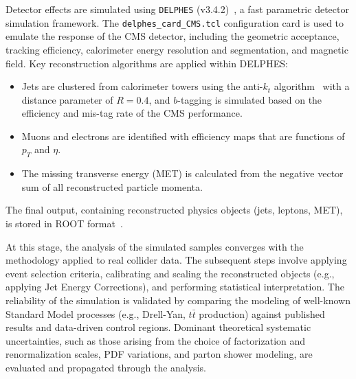 Detector effects are simulated using \texttt{DELPHES} (v3.4.2)~\parencite{deFavereau:2013fsa}, a fast parametric detector simulation framework. The \texttt{delphes\_card\_CMS.tcl} configuration card is used to emulate the response of the CMS detector, including the geometric acceptance, tracking efficiency, calorimeter energy resolution and segmentation, and magnetic field. Key reconstruction algorithms are applied within DELPHES:
\begin{itemize}
    \item Jets are clustered from calorimeter towers using the anti-$k_t$ algorithm~\parencite{Cacciari:2008gp} with a distance parameter of $R=0.4$, and $b$-tagging is simulated based on the efficiency and mis-tag rate of the CMS performance.
    \item Muons and electrons are identified with efficiency maps that are functions of $p_T$ and $\eta$.
    \item The missing transverse energy (MET) is calculated from the negative vector sum of all reconstructed particle momenta.
\end{itemize}
The final output, containing reconstructed physics objects (jets, leptons, MET), is stored in ROOT format~\parencite{Brun:1997pa}.

At this stage, the analysis of the simulated samples converges with the methodology applied to real collider data. The subsequent steps involve applying event selection criteria, calibrating and scaling the reconstructed objects (e.g., applying Jet Energy Corrections), and performing statistical interpretation. The reliability of the simulation is validated by comparing the modeling of well-known Standard Model processes (e.g., Drell-Yan, $t\bar{t}$ production) against published results and data-driven control regions. Dominant theoretical systematic uncertainties, such as those arising from the choice of factorization and renormalization scales, PDF variations, and parton shower modeling, are evaluated and propagated through the analysis.

